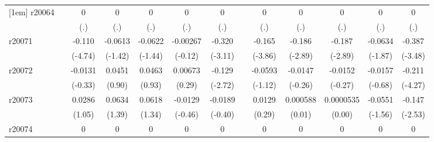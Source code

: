 {\begin{tabular}{l*{12}{c}}
[1em]
r20064      &                     &           0         &           0         &           0         &           0         &           0         &                     &           0         &           0         &           0         &           0         &           0         \\
            &                     &         (.)         &         (.)         &         (.)         &         (.)         &         (.)         &                     &         (.)         &         (.)         &         (.)         &         (.)         &         (.)         \\
[1em]
r20071      &                     &      -0.110\sym{***}&     -0.0613         &     -0.0622         &    -0.00267         &      -0.320\sym{**} &                     &      -0.165\sym{***}&      -0.186\sym{**} &      -0.187\sym{**} &     -0.0634         &      -0.387\sym{**} \\
            &                     &     (-4.74)         &     (-1.42)         &     (-1.44)         &     (-0.12)         &     (-3.11)         &                     &     (-3.86)         &     (-2.89)         &     (-2.89)         &     (-1.87)         &     (-3.48)         \\
[1em]
r20072      &                     &     -0.0131         &      0.0451         &      0.0463         &     0.00673         &      -0.129\sym{**} &                     &     -0.0593         &     -0.0147         &     -0.0152         &     -0.0157         &      -0.211\sym{***}\\
            &                     &     (-0.33)         &      (0.90)         &      (0.93)         &      (0.29)         &     (-2.72)         &                     &     (-1.12)         &     (-0.26)         &     (-0.27)         &     (-0.68)         &     (-4.27)         \\
[1em]
r20073      &                     &      0.0286         &      0.0634         &      0.0618         &     -0.0129         &     -0.0189         &                     &      0.0129         &    0.000588         &   0.0000535         &     -0.0551         &      -0.147\sym{*}  \\
            &                     &      (1.05)         &      (1.39)         &      (1.34)         &     (-0.46)         &     (-0.40)         &                     &      (0.29)         &      (0.01)         &      (0.00)         &     (-1.56)         &     (-2.53)         \\
[1em]
r20074      &                     &           0         &           0         &           0         &           0         &           0         &                     &           0         &           0         &           0         &           0         &           0         \\

\end{tabular}}
